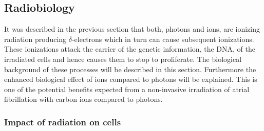 \subsection{Radiobiology}
\label{radiobio}
It was described in the previous section that both, photons and ions, are ionizing radiation producing $\delta$-electrons which 
in turn can cause subsequent ionizations. These ionizations attack the carrier of the genetic information, the DNA, of the irradiated 
cells and hence causes them to stop to proliferate. The biological background of these processes will be described in this section. 
Furthermore the enhanced biological effect of ions compared to photons will be explained. This is one of the potential benefits expected 
from a non-invasive irradiation of atrial fibrillation with carbon ions compared to photons. 


\subsubsection{Impact of radiation on cells}

